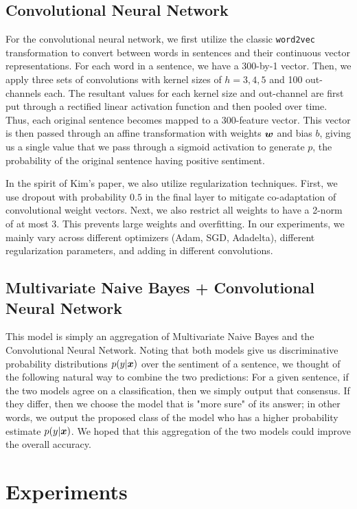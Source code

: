 \documentclass[11pt]{article}
\begin{document}
\subsection{Convolutional Neural Network}
For the convolutional neural network, we first utilize the classic \texttt{word2vec} transformation to convert between words in sentences and their continuous vector representations.  For each word in a sentence, we have a 300-by-1 vector.  Then, we apply three sets of convolutions with kernel sizes of $h = 3, 4, 5$ and 100 out-channels each.  The resultant values for each kernel size and out-channel are first put through a rectified linear activation function and then pooled over time.  Thus, each original sentence becomes mapped to a 300-feature vector.  This vector is then passed through an affine transformation with weights $\boldsymbol{w}$ and bias $b$, giving us a single value that we pass through a sigmoid activation to generate $p$, the probability of the original sentence having positive sentiment.  

In the spirit of Kim's paper, we also utilize regularization techniques.  First, we use dropout with probability $0.5$ in the final layer to mitigate co-adaptation of convolutional weight vectors.  Next, we also restrict all weights to have a 2-norm of at most 3.  This prevents large weights and overfitting.  In our experiments, we mainly vary across different optimizers (Adam, SGD, Adadelta), different regularization parameters, and adding in different convolutions.  

\subsection{Multivariate Naive Bayes + Convolutional Neural Network}

This model is simply an aggregation of Multivariate Naive Bayes and the Convolutional Neural Network.  Noting that both models give us discriminative probability distributions $p(y \vert \boldsymbol{x})$ over the sentiment of a sentence, we thought of the following natural way to combine the two predictions: For a given sentence, if the two models agree on a classification, then we simply output that consensus.  If they differ, then we choose the model that is "more sure" of its answer; in other words, we output the proposed class of the model who has a higher probability estimate $p(y \vert \boldsymbol{x})$.  We hoped that this aggregation of the two models could improve the overall accuracy.   
\section{Experiments}
\end{document}
